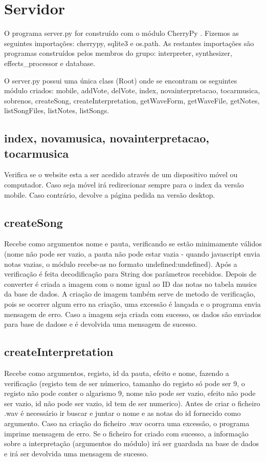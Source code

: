 \chapter{Servidor}
\label{chap.servidor}

O programa server.py for construído  com o módulo CherryPy \cite{cherry}. Fizemos as seguintes importações: cherrypy, sqlite3 e os.path. As restantes importações são programas construídos pelos membros do grupo: interpreter, synthesizer, effects\_processor e database.

O server.py possui uma única class (Root) onde se encontram os seguintes módulo criados: mobile, addVote, delVote, index, novainterpretacao, tocarmusica, sobrenos, createSong, createInterpretation, getWaveForm, getWaveFile, getNotes, listSongFiles, listNotes, listSongs.

\section{index, novamusica, novainterpretacao, tocarmusica}
Verifica se o website esta a ser acedido através de um dispositivo móvel ou computador. Caso seja móvel irá redirecionar sempre para o index da versão mobile. Caso contrário, devolve a página pedida na versão desktop.

\section{createSong}
Recebe como argumentos nome e pauta, verificando se estão minimamente válidos (nome não pode ser vazio, a pauta não pode estar vazia - quando javascript envia notas vazias, o módulo recebe-as no formato undefined:undefined). Após a verificação é feita decodificação para String dos parâmetros recebidos. Depois de converter é criada a imagem com o nome igual ao ID das notas no tabela musics da base de dados. A criação de imagem também serve de metodo de verificação, pois se ocorrer algum erro na criação, uma excessão é lançada e o programa envia mensagem de erro. Caso a imagem seja criada com sucesso, os dados são enviados para base de dadose e é devolvida uma mensagem de sucesso.

\section{createInterpretation}
Recebe como argumentos, registo, id da pauta, efeito e nome, fazendo a verificação (registo tem de ser númerico, tamanho do registo só pode ser 9, o registo não pode conter o algarismo 9, nome não pode ser vazio, efeito não pode ser vazio, id não pode ser vazio, id tem de ser numerico). Antes de criar o ficheiro .wav é necessário ir buscar e juntar o nome e as notas do id fornecido como argumento. Caso na criação do ficheiro .wav ocorra uma excessão, o programa imprime mensagem de erro. Se o ficheiro for criado com sucesso, a informação sobre a interpretação (argumentos do módulo) irá ser guardada na base de dados e irá ser devolvida uma mensagem de sucesso.

